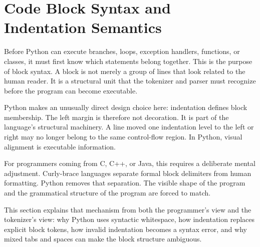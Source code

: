 \section{Code Block Syntax and Indentation Semantics}

Before Python can execute branches, loops, exception handlers, functions, or classes, it must first know which statements belong together. This is the purpose of block syntax. A block is not merely a group of lines that look related to the human reader. It is a structural unit that the tokenizer and parser must recognize before the program can become executable.

Python makes an unusually direct design choice here: indentation defines block membership. The left margin is therefore not decoration. It is part of the language's structural machinery. A line moved one indentation level to the left or right may no longer belong to the same control-flow region. In Python, visual alignment is executable information.

For programmers coming from C, C++, or Java, this requires a deliberate mental adjustment. Curly-brace languages separate formal block delimiters from human formatting. Python removes that separation. The visible shape of the program and the grammatical structure of the program are forced to match.

This section explains that mechanism from both the programmer's view and the tokenizer's view: why Python uses syntactic whitespace, how indentation replaces explicit block tokens, how invalid indentation becomes a syntax error, and why mixed tabs and spaces can make the block structure ambiguous.